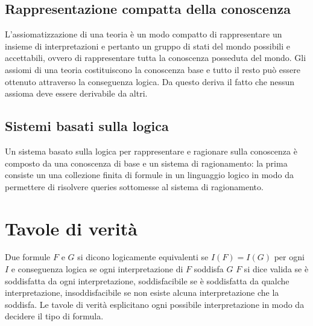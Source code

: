 \subsection{Rappresentazione compatta della conoscenza}
L'assiomatizzazione di una teoria \`e un modo compatto di rappresentare un insieme di interpretazioni e pertanto un gruppo di stati del mondo possibili e accettabili, ovvero di rappresentare tutta la 
conoscenza posseduta del mondo. Gli assiomi di una teoria costituiscono la conoscenza base e tutto il resto pu\`o essere ottenuto attraverso la conseguenza logica. Da questo deriva il fatto che nessun assioma
deve essere derivabile da altri.
\subsection{Sistemi basati sulla logica}
Un sistema basato sulla logica per rappresentare e ragionare sulla conoscenza \`e composto da una conoscenza di base e un sistema di ragionamento: la prima consiste un una collezione finita di formule in un
linguaggio logico in modo da permettere di risolvere queries sottomesse al sistema di ragionamento. 
\section{Tavole di verit\`a}
Due formule $F$ e $G$ si dicono logicamente equivalenti se $I(F)=I(G)$ per ogni $I$ e conseguenza logica se ogni interpretazione di $F$ soddisfa $G$ $F$ si dice valida se \`e soddisfatta da ogni 
interpretazione, soddisfacibile se \`e soddisfatta da qualche interpretazione, insoddisfacibile se non esiste alcuna interpretazione che la soddisfa. Le tavole di verit\`a esplicitano ogni possibile interpretazione
in modo da decidere il tipo di formula.
